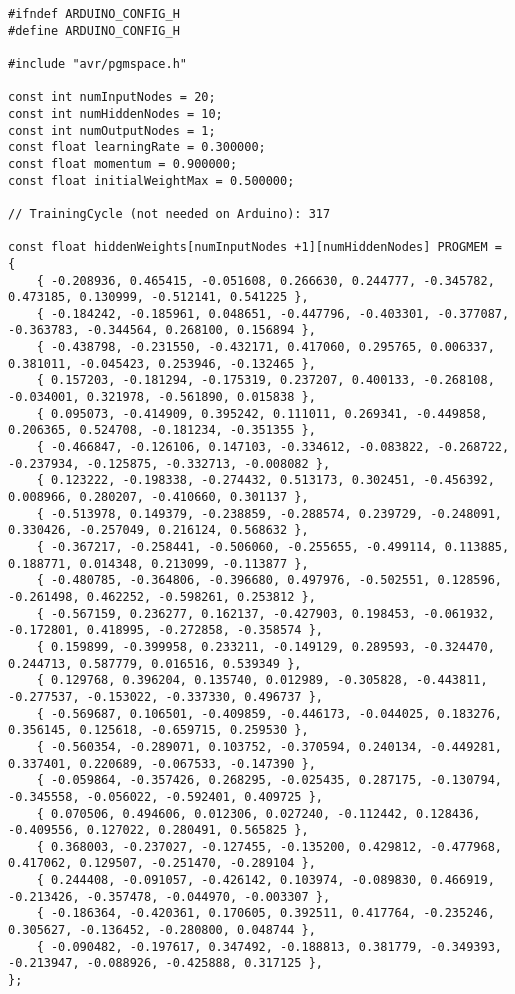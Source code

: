 \documentclass[a4paper]{article}
\begin{document}
\begin{lstlisting}
#ifndef ARDUINO_CONFIG_H
#define ARDUINO_CONFIG_H

#include "avr/pgmspace.h"

const int numInputNodes = 20;
const int numHiddenNodes = 10;
const int numOutputNodes = 1;
const float learningRate = 0.300000;
const float momentum = 0.900000;
const float initialWeightMax = 0.500000;

// TrainingCycle (not needed on Arduino): 317

const float hiddenWeights[numInputNodes +1][numHiddenNodes] PROGMEM = {
    { -0.208936, 0.465415, -0.051608, 0.266630, 0.244777, -0.345782, 0.473185, 0.130999, -0.512141, 0.541225 }, 
    { -0.184242, -0.185961, 0.048651, -0.447796, -0.403301, -0.377087, -0.363783, -0.344564, 0.268100, 0.156894 }, 
    { -0.438798, -0.231550, -0.432171, 0.417060, 0.295765, 0.006337, 0.381011, -0.045423, 0.253946, -0.132465 }, 
    { 0.157203, -0.181294, -0.175319, 0.237207, 0.400133, -0.268108, -0.034001, 0.321978, -0.561890, 0.015838 }, 
    { 0.095073, -0.414909, 0.395242, 0.111011, 0.269341, -0.449858, 0.206365, 0.524708, -0.181234, -0.351355 }, 
    { -0.466847, -0.126106, 0.147103, -0.334612, -0.083822, -0.268722, -0.237934, -0.125875, -0.332713, -0.008082 }, 
    { 0.123222, -0.198338, -0.274432, 0.513173, 0.302451, -0.456392, 0.008966, 0.280207, -0.410660, 0.301137 }, 
    { -0.513978, 0.149379, -0.238859, -0.288574, 0.239729, -0.248091, 0.330426, -0.257049, 0.216124, 0.568632 }, 
    { -0.367217, -0.258441, -0.506060, -0.255655, -0.499114, 0.113885, 0.188771, 0.014348, 0.213099, -0.113877 }, 
    { -0.480785, -0.364806, -0.396680, 0.497976, -0.502551, 0.128596, -0.261498, 0.462252, -0.598261, 0.253812 }, 
    { -0.567159, 0.236277, 0.162137, -0.427903, 0.198453, -0.061932, -0.172801, 0.418995, -0.272858, -0.358574 }, 
    { 0.159899, -0.399958, 0.233211, -0.149129, 0.289593, -0.324470, 0.244713, 0.587779, 0.016516, 0.539349 }, 
    { 0.129768, 0.396204, 0.135740, 0.012989, -0.305828, -0.443811, -0.277537, -0.153022, -0.337330, 0.496737 }, 
    { -0.569687, 0.106501, -0.409859, -0.446173, -0.044025, 0.183276, 0.356145, 0.125618, -0.659715, 0.259530 }, 
    { -0.560354, -0.289071, 0.103752, -0.370594, 0.240134, -0.449281, 0.337401, 0.220689, -0.067533, -0.147390 }, 
    { -0.059864, -0.357426, 0.268295, -0.025435, 0.287175, -0.130794, -0.345558, -0.056022, -0.592401, 0.409725 }, 
    { 0.070506, 0.494606, 0.012306, 0.027240, -0.112442, 0.128436, -0.409556, 0.127022, 0.280491, 0.565825 }, 
    { 0.368003, -0.237027, -0.127455, -0.135200, 0.429812, -0.477968, 0.417062, 0.129507, -0.251470, -0.289104 }, 
    { 0.244408, -0.091057, -0.426142, 0.103974, -0.089830, 0.466919, -0.213426, -0.357478, -0.044970, -0.003307 }, 
    { -0.186364, -0.420361, 0.170605, 0.392511, 0.417764, -0.235246, 0.305627, -0.136452, -0.280800, 0.048744 }, 
    { -0.090482, -0.197617, 0.347492, -0.188813, 0.381779, -0.349393, -0.213947, -0.088926, -0.425888, 0.317125 }, 
};


\end{lstlisting}
\end{document}
